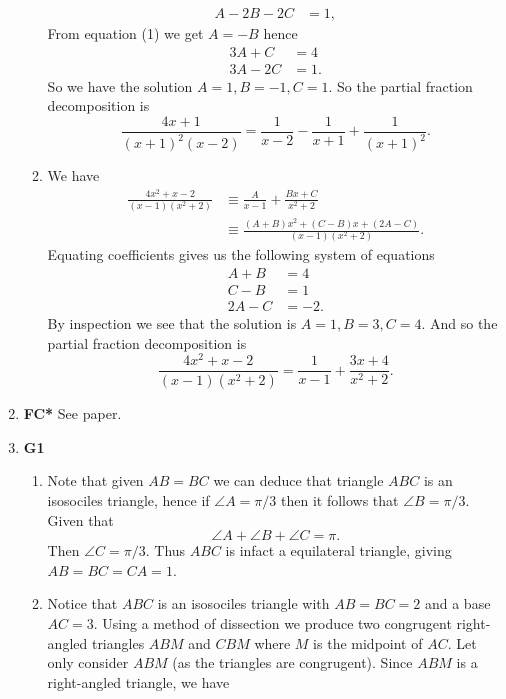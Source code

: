 \documentclass[12pt,oneside]{book}
\begin{document}
\begin{enumerate}
\begin{enumerate}
\begin{align*}
                A - 2B - 2C &= 1,
            \end{align*}
            From equation (1) we get $A = -B$ hence \begin{align*}
                3A + C &= 4 \\
                3A - 2C &= 1.
            \end{align*}
            So we have the solution $A = 1, B = -1, C = 1$. So the partial fraction decomposition is \[
                \frac{4x+1}{(x+1)^2(x-2)} = \frac{1}{x-2} - \frac{1}{x+1} + \frac{1}{(x+1)^2}
            .\] 
            \item We have \begin{align*}
                \frac{4x^2 + x - 2}{(x-1)(x^2 + 2)} &\equiv \frac{A}{x-1} + \frac{Bx+C}{x^2 + 2} \\
                &\equiv \frac{(A + B)x^2 + (C - B)x + (2A - C)}{(x-1)(x^2 + 2)}.
            \end{align*}
            Equating coefficients gives us the following system of equations \begin{align*}
                A + B &= 4 \\
                C - B &= 1 \\
                2A - C &= -2.
            \end{align*}
            By inspection we see that the solution is $A = 1, B = 3, C = 4$. And so the partial fraction decomposition is \[
                \frac{4x^2 + x - 2}{(x-1)(x^2 + 2)} = \frac{1}{x-1} + \frac{3x + 4}{x^2 + 2}
            .\] 
        \end{enumerate}
        \item \textbf{FC*} See paper. 
        \item \textbf{G1} \begin{enumerate}
            \item Note that given $AB = BC$ we can deduce that triangle $ABC$ is an isosociles triangle, hence if $\angle A = \pi/3$ then it follows that $\angle B = \pi/3$. Given that \[
                \angle A + \angle B + \angle C = \pi
            .\] Then $\angle C = \pi/3$. Thus $ABC$ is infact a equilateral triangle, giving $AB = BC = CA = 1$.
            \item Notice that $ABC$ is an isosociles triangle with $AB = BC = 2$ and a base $AC = 3$. Using a method of dissection we produce two congrugent right-angled triangles $ABM$ and $CBM$ where $M$ is the midpoint of $AC$. Let only consider $ABM$ (as the triangles are congrugent). Since $ABM$ is a right-angled triangle, we have \[
\]
\end{enumerate}
\end{enumerate}
\end{document}
